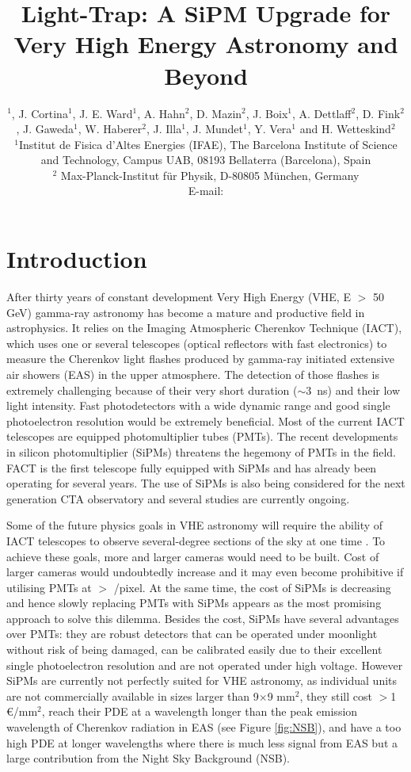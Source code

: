 \documentclass{PoS}
\title{Light-Trap: A SiPM Upgrade for Very High Energy Astronomy and Beyond}
\author{\speaker{D. Guberman}$^{1}$, J. Cortina$^{1}$, J. E. Ward$^{1}$, A. Hahn$^{2}$, D. Mazin$^{2}$, J. Boix$^{1}$, A. Dettlaff$^{2}$, D. Fink$^{2}$, J. Gaweda$^{1}$, W. Haberer$^{2}$, J. Illa$^{1}$, J. Mundet$^{1}$, Y. Vera$^{1}$ and H. Wetteskind$^{2}$ \\
       $^{1}$Institut de Fisica d'Altes Energies (IFAE), The Barcelona Institute of Science and Technology, Campus UAB, 08193 Bellaterra (Barcelona), Spain\\
       $^{2}$ Max-Planck-Institut f\"ur Physik, D-80805 M\"unchen, Germany \\
        E-mail: \email{dguberman@ifae.es}}
\begin{document}
\section{Introduction}
\label{sec:intro}

After thirty years of constant development Very High Energy (VHE, E $>$ 50 GeV) gamma-ray astronomy has become a mature and productive field in astrophysics. It relies on the Imaging Atmospheric Cherenkov Technique (IACT), which uses one or several telescopes (optical reflectors with fast electronics) to measure the Cherenkov light flashes produced by gamma-ray initiated extensive air showers (EAS) in the upper atmosphere. The detection of those flashes is extremely challenging because of their very short duration ($\sim$3~ns) and their low light intensity. Fast photodetectors with a wide dynamic range and good single photoelectron resolution would be extremely beneficial. Most of the current IACT telescopes are equipped photomultiplier tubes (PMTs). The recent developments in silicon photomultiplier (SiPMs) threatens the hegemony of PMTs in the field. FACT is the first telescope fully equipped with SiPMs and has already been operating for several years\cite{FACT}. The use of SiPMs is also being considered for the next generation CTA observatory and several studies are currently ongoing\cite{SiPM1,SiPM2,SiPM3,SiPM4,LTiWorid}.


Some of the future physics goals in VHE astronomy will require the ability of IACT telescopes to observe several-degree sections of the sky at one time \cite{CTA, machete}. To achieve these goals, more and larger cameras would need to be built. Cost of larger cameras would undoubtedly increase and it may even become prohibitive if utilising PMTs at $>$  /pixel. At the same time, the cost of SiPMs is decreasing and hence slowly replacing PMTs with SiPMs appears as the most promising approach to solve this dilemma. Besides the cost, SiPMs have several advantages over PMTs: they are robust detectors that can be operated under moonlight without risk of being damaged, can be calibrated easily due to their excellent single photoelectron resolution and are not operated under high voltage. However SiPMs are currently not perfectly suited for VHE astronomy, as individual units are not commercially available in sizes larger than 9$\times$9 mm$^{2}$, they still cost $>$1 \euro{}/mm$^{2}$, reach their PDE at a wavelength longer than the peak emission wavelength of Cherenkov radiation in EAS (see Figure \ref{fig:NSB}), and have a too high PDE at longer wavelengths where there is much less signal from EAS but a large contribution from the Night Sky Background (NSB).
\end{document}
